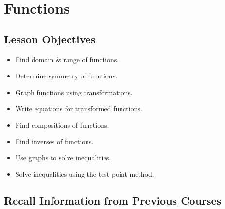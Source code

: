 \chapter{Functions}

\section{Lesson Objectives}
\begin{itemize}
    \item Find domain \& range of functions. \\\textbf{\och}
    \item Determine symmetry of functions. \\\textbf{\och}
    \item Graph functions using transformations. \\\textbf{\oca}
    \item Write equations for transformed functions. \\\textbf{\och}
    \item Find compositions of functions. \\\textbf{\oca}
    \item Find inverses of functions. \\\textbf{\oca}
    \item Use graphs to solve inequalities. \\\textbf{\oca}
    \item Solve inequalities using the test-point method. \\\textbf{\och}
\end{itemize}


\newpage

\section{Recall Information from Previous Courses}
